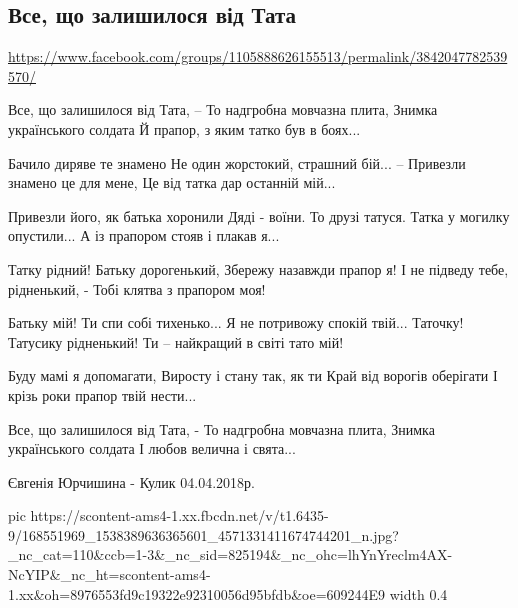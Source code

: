  
 
 
 
 

\subsection{Все, що залишилося від Тата}
\label{sec:05_04_2021.fb.jurchishina_evgenija.1.tato_poezia}
\url{https://www.facebook.com/groups/1105888626155513/permalink/3842047782539570/}

Все, що залишилося від Тата, --
То надгробна мовчазна плита,
Знимка українського солдата
Й прапор, з яким татко був в боях...

Бачило диряве те знамено
Не один жорстокий, страшний бій...
-- Привезли знамено це для мене,
Це від татка дар останній мій...

Привезли його, як батька хоронили
Дяді - воїни. То друзі татуся.
Татка у могилку опустили...
А із прапором стояв і плакав я...

Татку рідний! Батьку дорогенький,
Збережу назавжди прапор я!
І не підведу тебе, рідненький, -
Тобі клятва з прапором моя!

Батьку мій! Ти спи собі тихенько...
Я не потривожу спокій твій...
Таточку! Татусику рідненький!
Ти -- найкращий в світі тато мій!

Буду мамі я допомагати,
Виросту і стану так, як ти
Край від ворогів оберігати
І крізь роки прапор твій нести...

Все, що залишилося від Тата, -
То надгробна мовчазна плита,
Знимка українського солдата
І любов велична і свята...

Євгенія Юрчишина - Кулик
04.04.2018р.


\ifcmt
  pic https://scontent-ams4-1.xx.fbcdn.net/v/t1.6435-9/168551969_1538389636365601_4571331411674744201_n.jpg?_nc_cat=110&ccb=1-3&_nc_sid=825194&_nc_ohc=lhYnYreclm4AX-NcYIP&_nc_ht=scontent-ams4-1.xx&oh=8976553fd9c19322e92310056d95bfdb&oe=609244E9
  width 0.4
\fi

